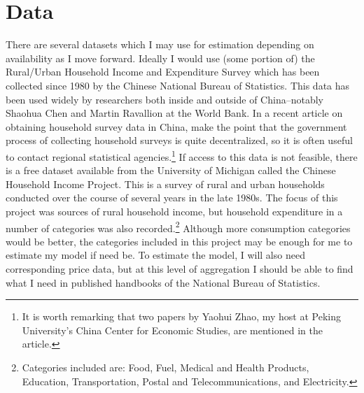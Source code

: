 \documentclass[a4paper,10pt]{article}
\begin{document}
\section{Data}
There are several datasets which I may use for estimation depending on availability as I move forward.  Ideally I would use (some portion of) the Rural/Urban Household Income and Expenditure Survey which has been collected since 1980 by the Chinese National Bureau of Statistics.  This data has been used widely by researchers both inside and outside of China--notably Shaohua Chen and Martin Ravallion at the World Bank.  In a recent article on obtaining household survey data in China, \citet{GustafssonShi2006} make the point that the government process of collecting household surveys is quite decentralized, so it is often useful to contact regional statistical agencies.\footnote{It is worth remarking that two papers by Yaohui Zhao, my host at Peking University's China Center for Economic Studies, are mentioned in the article.}  If access to this data is not feasible, there is a free dataset available from the University of Michigan called the Chinese Household Income Project.  This is a survey of rural and urban households conducted over the course of several years in the late 1980s.  The focus of this project was sources of rural household income, but household expenditure in a number of categories was also recorded.\footnote{Categories included are: Food, Fuel, Medical and Health Products, Education, Transportation, Postal and Telecommunications, and Electricity.}  Although more consumption categories would be better, the categories included in this project may be enough for me to estimate my model if need be.  To estimate the model, I will also need corresponding price data, but at this level of aggregation I should be able to find what I need in published handbooks of the National Bureau of Statistics.    
\end{document}
